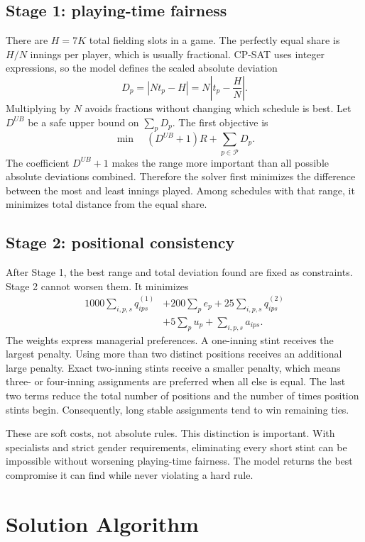 \documentclass[11pt]{article}
\begin{document}
\subsection{Stage 1: playing-time fairness}

There are $H=7K$ total fielding slots in a game. The perfectly equal share is
$H/N$ innings per player, which is usually fractional. CP-SAT uses integer
expressions, so the model defines the scaled absolute deviation
\[
D_p=\left|Nt_p-H\right|
    =N\left|t_p-\frac{H}{N}\right|.
\]
Multiplying by $N$ avoids fractions without changing which schedule is best.
Let $D^{UB}$ be a safe upper bound on $\sum_pD_p$. The first objective is
\[
\min\quad (D^{UB}+1)R+\sum_{p\in\mathcal{P}}D_p.
\]
The coefficient $D^{UB}+1$ makes the range more important than all possible
absolute deviations combined. Therefore the solver first minimizes the
difference between the most and least innings played. Among schedules with
that range, it minimizes total distance from the equal share.

\subsection{Stage 2: positional consistency}

After Stage 1, the best range and total deviation found are fixed as
constraints. Stage 2 cannot worsen them. It minimizes
\[
\begin{split}
1000\sum_{i,p,s}q^{(1)}_{ips}
&+200\sum_p e_p
+25\sum_{i,p,s}q^{(2)}_{ips}\\
&+5\sum_pu_p
+\sum_{i,p,s}a_{ips}.
\end{split}
\]
The weights express managerial preferences. A one-inning stint receives the
largest penalty. Using more than two distinct positions receives an additional
large penalty. Exact two-inning stints receive a smaller penalty, which means
three- or four-inning assignments are preferred when all else is equal. The
last two terms reduce the total number of positions and the number of times
position stints begin. Consequently, long stable assignments tend to win
remaining ties.

These are soft costs, not absolute rules. This distinction is important. With
specialists and strict gender requirements, eliminating every short stint can
be impossible without worsening playing-time fairness. The model returns the
best compromise it can find while never violating a hard rule.

\section{Solution Algorithm}
\end{document}
